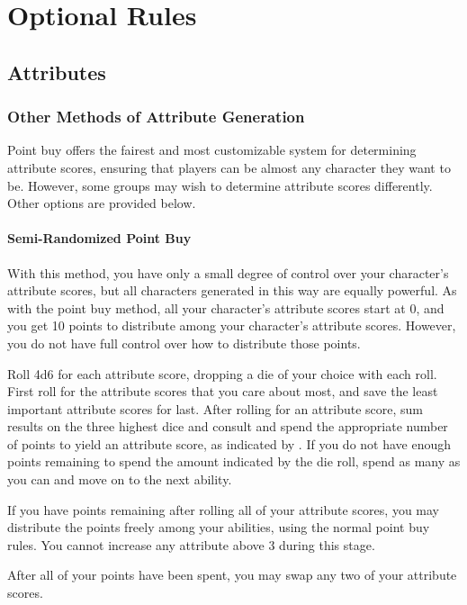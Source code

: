 \chapter{Optional Rules}

\section{Attributes}

    \subsection{Other Methods of Attribute Generation}
        Point buy offers the fairest and most customizable system for determining attribute scores, ensuring that players can be almost any character they want to be. However, some groups may wish to determine attribute scores differently. Other options are provided below.

        \subsubsection{Semi-Randomized Point Buy}
            With this method, you have only a small degree of control over your character's attribute scores, but all characters generated in this way are equally powerful. As with the point buy method, all your character's attribute scores start at 0, and you get 10 points to distribute among your character's attribute scores. However, you do not have full control over how to distribute those points.

            Roll 4d6 for each attribute score, dropping a die of your choice with each roll. First roll for the attribute scores that you care about most, and save the least important attribute scores for last. After rolling for an attribute score, sum results on the three highest dice and consult  and spend the appropriate number of points to yield an attribute score, as indicated by . If you do not have enough points remaining to spend the amount indicated by the die roll, spend as many as you can and move on to the next ability.

            If you have points remaining after rolling all of your attribute scores, you may distribute the points freely among your abilities, using the normal point buy rules. You cannot increase any attribute above 3 during this stage.

            After all of your points have been spent, you may swap any two of your attribute scores.

